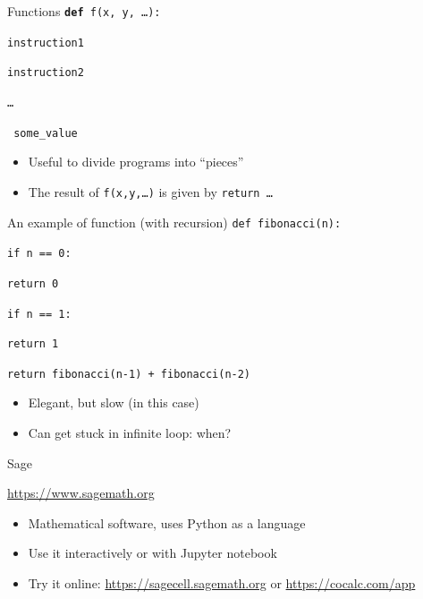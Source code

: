 \documentclass[11pt]{beamer}
\begin{document}
\begin{frame}{Functions}
  \texttt{{\bf def} f(x, y, \dots): }

  \texttt{\qquad instruction1}
  
  \texttt{\qquad instruction2}

  \texttt{\qquad \dots}

  \texttt{ some\_value}

  \vspace{0.3cm}
  \begin{itemize}
    \item Useful to divide programs into ``pieces''
    \item The result of \texttt{f(x,y,\dots)} is given by \texttt{return \dots}
  \end{itemize}
\end{frame}

\begin{frame}{An example of function (with recursion)}
  \texttt{def fibonacci(n):}

  \texttt{\qquad if n == 0:}

  \texttt{\qquad \qquad return 0}

  \texttt{\qquad if n == 1:}

  \texttt{\qquad \qquad return 1}

  \texttt{\qquad return fibonacci(n-1) + fibonacci(n-2)}

  \vspace{0.3cm}
  \begin{itemize}
    \item Elegant, but slow (in this case)
    \item Can get stuck in infinite loop: when?
  \end{itemize}
\end{frame}

\begin{frame}{Sage}
  \begin{center}
    

    \url{https://www.sagemath.org}
  \end{center}

  \vspace{0.3cm}
  \begin{itemize}
    \item Mathematical software, uses Python as a language
    \item Use it interactively or with Jupyter notebook
    \item Try it online: \url{https://sagecell.sagemath.org} or
          \url{https://cocalc.com/app}
  \end{itemize}
\end{frame}
\end{document}
